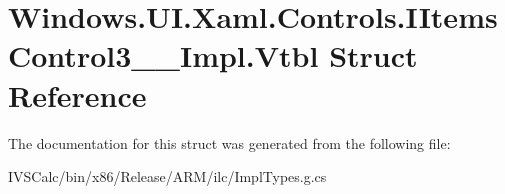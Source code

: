 \hypertarget{struct_windows_1_1_u_i_1_1_xaml_1_1_controls_1_1_i_items_control3_____impl_1_1_vtbl}{}\section{Windows.\+U\+I.\+Xaml.\+Controls.\+I\+Items\+Control3\+\_\+\+\_\+\+Impl.\+Vtbl Struct Reference}
\label{struct_windows_1_1_u_i_1_1_xaml_1_1_controls_1_1_i_items_control3_____impl_1_1_vtbl}


The documentation for this struct was generated from the following file\+:\begin{DoxyCompactItemize}
\item 
I\+V\+S\+Calc/bin/x86/\+Release/\+A\+R\+M/ilc/Impl\+Types.\+g.\+cs\end{DoxyCompactItemize}
